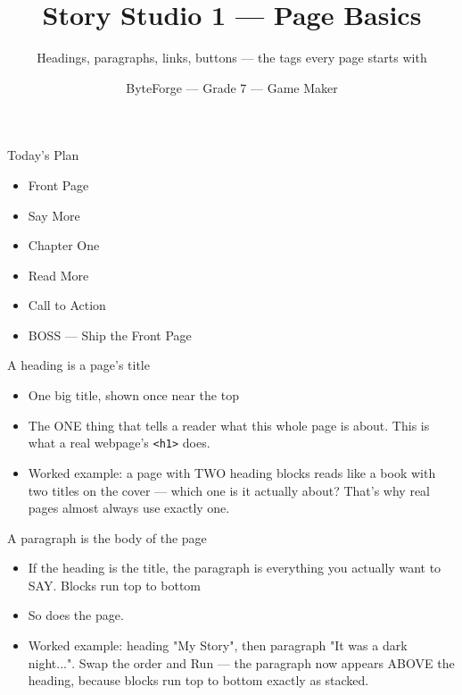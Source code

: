 \documentclass[aspectratio=169]{beamer}
\title{Story Studio 1 — Page Basics}
\subtitle{Headings, paragraphs, links, buttons — the tags every page starts with}
\author{ByteForge --- Grade 7 --- Game Maker}
\date{}
\begin{document}
\begin{frame}
    \titlepage
\end{frame}

\begin{frame}{Today's Plan}
    \begin{itemize}
        \item Front Page
        \item Say More
        \item Chapter One
        \item Read More
        \item Call to Action
        \item[$\bigstar$] BOSS --- Ship the Front Page
    \end{itemize}
\end{frame}

\begin{frame}{A heading is a page's title}
    \large
    \begin{itemize}
        \item One big title, shown once near the top
        \item The ONE thing that tells a reader what this whole page is about. This is what a real webpage's \texttt{<h1>} does.
        \item Worked example: a page with TWO heading blocks reads like a book with two titles on the cover — which one is it actually about? That's why real pages almost always use exactly one.
    \end{itemize}

    \begin{center}
    \end{center}
\end{frame}


\begin{frame}{A paragraph is the body of the page}
    \large
    \begin{itemize}
        \item If the heading is the title, the paragraph is everything you actually want to SAY. Blocks run top to bottom
        \item So does the page.
        \item Worked example: heading "My Story", then paragraph "It was a dark night...". Swap the order and Run — the paragraph now appears ABOVE the heading, because blocks run top to bottom exactly as stacked.
    \end{itemize}
\end{frame}
\end{document}
